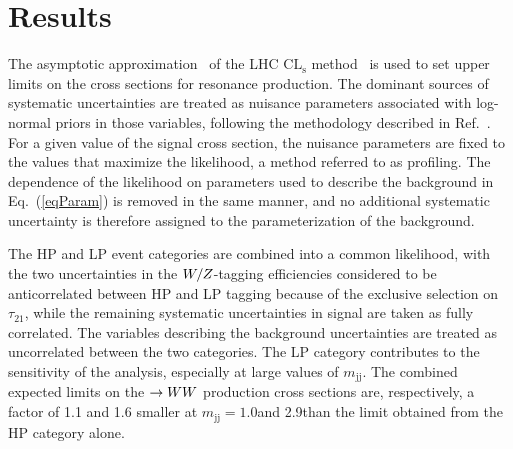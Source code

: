 \newpage
\section{Results}
\label{sec:results}




The asymptotic approximation~\cite{AsymptCLs} of the LHC
$\mathrm{CL_s}$ method~\cite{CLs1,CLs3} is used to set upper limits on
the cross sections for resonance production. The dominant sources of
systematic uncertainties are treated as nuisance parameters associated
with log-normal priors in those variables, following the methodology
described in Ref.~\cite{ATLASCMSstat}. For a given value of the
signal cross section, the nuisance parameters are fixed to the values
that maximize the likelihood, a method referred to as
profiling. The dependence of the likelihood on parameters used to
describe the background in Eq.~(\ref{eqParam}) is removed in the same
manner, and no additional systematic uncertainty is therefore assigned
to the parameterization of the background.

The HP and LP event categories are combined into a common likelihood,
with the two uncertainties in the $W/Z$-tagging efficiencies
considered to be anticorrelated between HP and LP tagging because of
the exclusive selection on $\tau_{21}$, while the remaining systematic
uncertainties in signal are taken as fully correlated. The variables
describing the background uncertainties are treated as uncorrelated
between the two categories. The LP category contributes to the
sensitivity of the analysis, especially at large values of
$m_\mathrm{jj}$. The combined expected limits on the \GRS $\to WW$
production cross sections are, respectively, a factor of 1.1 and 1.6
smaller at $m_\mathrm{jj}=1.0$\TeVcc and 2.9\TeVcc than the limit
obtained from the HP category alone.


